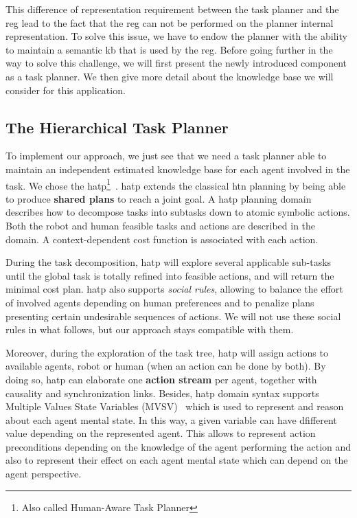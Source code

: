 This difference of representation requirement between the task planner and the \acrshort{reg} lead to the fact that the \acrshort{reg} can not be performed on the planner internal representation. To solve this issue, we have to endow the planner with the ability to maintain a semantic \acrshort{kb} that is used by the \acrshort{reg}. Before going further in the way to solve this challenge, we will first present the newly introduced component as a task planner. We then give more detail about the knowledge base we will consider for this application.


\subsection{The Hierarchical Task Planner}

To implement our approach, we just see that we need a task planner able to maintain an independent estimated knowledge base for each agent involved in the task. We chose the \acrfull{hatp}\footnote{Also called Human-Aware Task Planner}~\cite{lallement_2014_hatp}. \acrshort{hatp} extends the classical \acrfull{htn} planning by being able to produce \textbf{shared plans} to reach a joint goal. A \acrshort{hatp} planning domain describes how to decompose tasks into subtasks down to atomic symbolic actions. Both the robot and human feasible tasks and actions are described in the domain. A context-dependent cost function is associated with each action. 

During the task decomposition, \acrshort{hatp} will explore several applicable sub-tasks until the global task is totally refined into feasible actions, and will return the minimal cost plan. \acrshort{hatp} also supports \textit{social rules}, allowing to balance the effort of involved agents depending on human preferences and to penalize plans presenting certain undesirable sequences of actions. We will not use these social rules in what follows, but our approach stays compatible with them.

Moreover, during the exploration of the task tree, \acrshort{hatp} will assign actions to available agents, robot or human (when an action can be done by both). By doing so, \acrshort{hatp} can elaborate one \textbf{action stream} per agent, together with causality and synchronization links. 
Besides, \acrshort{hatp} domain syntax supports Multiple Values State Variables (MVSV)~\cite{guitton_2012_belief} which is used to represent and reason about each agent mental state. In this way, a given variable can have dfifferent value depending on the represented agent. This allows to represent action preconditions depending on the knowledge of the agent performing the action and also to represent their effect on each agent mental state which can depend on the agent perspective.

